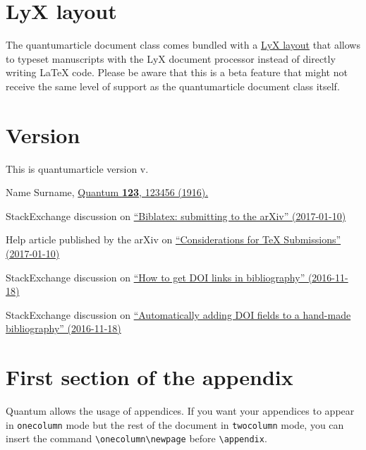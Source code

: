 \documentclass[a4paper,twocolumn,11pt,accepted=2017-05-09]{quantumarticle}
\begin{document}
\section{LyX layout}
\label{sec:lyx-layout}

The quantumarticle document class comes bundled with a \href{https://raw.githubusercontent.com/quantum-journal/quantum-journal/master/quantum-lyx-template.lyx}{LyX layout} that allows to typeset manuscripts with the LyX document processor instead of directly writing LaTeX code. Please be aware that this is a beta feature that might not receive the same level of support as the quantumarticle document class itself.

\section{Version}
\label{sec:version}
This is quantumarticle version v\quantumarticleversion.


\begin{thebibliography}{9}
  Name Surname,
  \href{https://doi.org/10.22331/
        idonotexist}{Quantum
        \textbf{123}, 123456 (1916).}

  StackExchange discussion on \href{http://tex.stackexchange.com/questions/26990/biblatex-submitting-to-the-arxiv}{``Biblatex: submitting to the arXiv'' (2017-01-10)}

  Help article published by the arXiv on \href{https://arxiv.org/help/submit_tex}{``Considerations for TeX Submissions'' (2017-01-10)}

  StackExchange discussion on \href{http://tex.stackexchange.com/questions/3802/how-to-get-doi-links-in-bibliography}{``How to get DOI links in bibliography'' (2016-11-18)}

  StackExchange discussion on \href{http://tex.stackexchange.com/questions/6810/automatically-adding-doi-fields-to-a-hand-made-bibliography}{``Automatically adding DOI fields to a hand-made bibliography'' (2016-11-18)}
\end{thebibliography}



\onecolumn
\appendix

\section{First section of the appendix}
Quantum allows the usage of appendices.
If you want your appendices to appear in \texttt{onecolumn} mode but the rest of the 
document in \texttt{twocolumn} mode, you can insert the command 
\texttt{\textbackslash{}onecolumn\textbackslash{}newpage} before
\texttt{\textbackslash{}appendix}.
\end{document}
